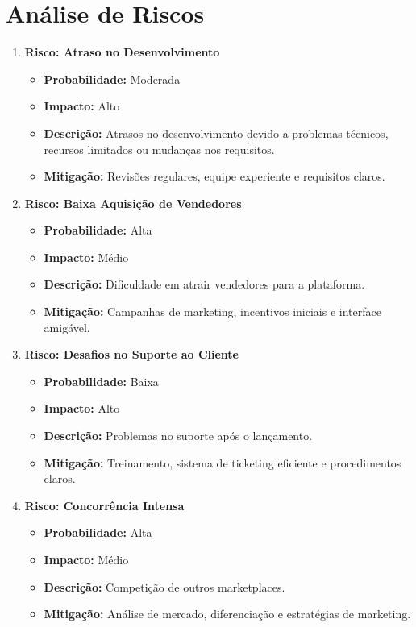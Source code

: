 \documentclass[
	12pt,				%
	openright,			%
	twoside,			%
	a4paper,			%
	english,			%
	brazil				%
	]{abntex2}
\begin{document}
\chapter{Análise de Riscos}\label{cap_analise_de_riscos}

\begin{enumerate}
    \item \textbf{Risco: Atraso no Desenvolvimento}
    \begin{itemize}
        \item \textbf{Probabilidade:} Moderada
        \item \textbf{Impacto:} Alto
        \item \textbf{Descrição:} Atrasos no desenvolvimento devido a problemas técnicos, recursos limitados ou mudanças nos requisitos.
        \item \textbf{Mitigação:} Revisões regulares, equipe experiente e requisitos claros.
    \end{itemize}
    
    \item \textbf{Risco: Baixa Aquisição de Vendedores}
    \begin{itemize}
        \item \textbf{Probabilidade:} Alta
        \item \textbf{Impacto:} Médio
        \item \textbf{Descrição:} Dificuldade em atrair vendedores para a plataforma.
        \item \textbf{Mitigação:} Campanhas de marketing, incentivos iniciais e interface amigável.
    \end{itemize}
    
    \item \textbf{Risco: Desafios no Suporte ao Cliente}
    \begin{itemize}
        \item \textbf{Probabilidade:} Baixa
        \item \textbf{Impacto:} Alto
        \item \textbf{Descrição:} Problemas no suporte após o lançamento.
        \item \textbf{Mitigação:} Treinamento, sistema de ticketing eficiente e procedimentos claros.
    \end{itemize}
    
    \item \textbf{Risco: Concorrência Intensa}
    \begin{itemize}
        \item \textbf{Probabilidade:} Alta
        \item \textbf{Impacto:} Médio
        \item \textbf{Descrição:} Competição de outros marketplaces.
        \item \textbf{Mitigação:} Análise de mercado, diferenciação e estratégias de marketing.
    \end{itemize}
    

\end{enumerate}
\end{document}
